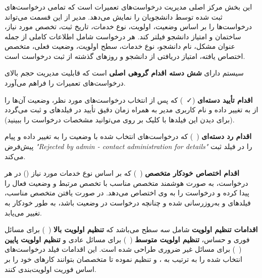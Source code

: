\documentclass[12pt,a4paper]{report}
\begin{document}
	\subsubsection*{}
	
	این بخش مرکز اصلی مدیریت درخواست‌های تعمیرات است که تمامی درخواست‌های ثبت شده توسط دانشجویان را نمایش می‌دهد. مدیر از این قسمت می‌تواند درخواست‌ها را بر اساس وضعیت، اولویت، نوع خدمات، تاریخ ثبت، تخصص مورد نیاز، ساختمان و امتیاز دانشجو فیلتر کند. هر درخواست شامل اطلاعات کاملی از جمله عنوان مشکل، نام دانشجو، نوع خدمات، سطح اولویت، وضعیت فعلی، متخصص اختصاص یافته، امتیاز دریافتی از دانشجو و روزهای گذشته از ثبت درخواست است.
	
	سیستم دارای \textbf{شش دسته اقدام گروهی اصلی} است که قابلیت مدیریت حجم بالای درخواست‌های تعمیرات را فراهم می‌آورد. 
	
	\textbf{اقدام تأیید دسته‌ای} (\faCheck\  ) که پس از انتخاب درخواست‌های مورد نظر، وضعیت آن‌ها را از  به  تغییر داده و نام کاربری مدیر به همراه زمان دقیق تأیید در فیلدهای  و  ثبت می‌گردد (برای دیدن این فیلدها با کلیک بر روی  می‌توانید مشخصات درخواست را ببینید).
	
	\textbf{اقدام رد دسته‌ای} (\faTimes\  ) که درخواست‌های انتخاب شده با وضعیت  را به  تغییر داده و پیام پیش‌فرض \textit{"Rejected by admin - contact administration for details"} را در فیلد  ثبت می‌کند.
	
	\textbf{اقدام اختصاص خودکار متخصص} (\faUser\  ) که بر اساس نوع خدمات مورد نیاز () در هر درخواست، به صورت هوشمند متخصص مناسب با تخصص مرتبط و وضعیت فعال را پیدا کرده و درخواست را به وی اختصاص می‌دهد. در صورت یافتن متخصص مناسب، فیلدهای  و  به‌روزرسانی شده و چنانچه درخواست در وضعیت  باشد، به طور خودکار به  تغییر می‌یابد.
	
	\textbf{اقدامات تنظیم اولویت} شامل سه سطح می‌باشد که \textbf{تنظیم اولویت بالا} (\textcolor{red}{\faCircle}\  ) برای مسائل فوری و حساس، \textbf{تنظیم اولویت متوسط} (\textcolor{orange}{\faCircle}\  ) برای مسائل عادی و \textbf{تنظیم اولویت پایین} (\textcolor{green}{\faCircle}\  ) برای مسائل غیر ضروری طراحی شده است. این اقدامات فیلد  درخواست‌های انتخاب شده را به ترتیب به ،  و  تنظیم نموده تا متخصصان بتوانند کارهای خود را بر اساس فوریت اولویت‌بندی کنند.
	
\end{document}
